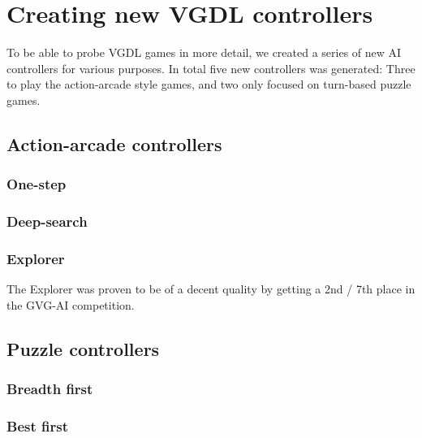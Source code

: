 \documentclass[a4paper,titlepage,final, twoside]{report}
\begin{document}

\section{Creating new VGDL controllers}
To be able to probe VGDL games in more detail, we created a series of new AI controllers for various purposes.
In total five new controllers was generated: Three to play the action-arcade style games, and two only focused on turn-based puzzle games.

\subsection{Action-arcade controllers}

\subsubsection*{One-step}

\subsubsection*{Deep-search}

\subsubsection*{Explorer}

The Explorer was proven to be of a decent quality by getting a 2nd / 7th place in the GVG-AI competition.

\subsection{Puzzle controllers}

\subsubsection*{Breadth first}

\subsubsection*{Best first}


\end{document}
